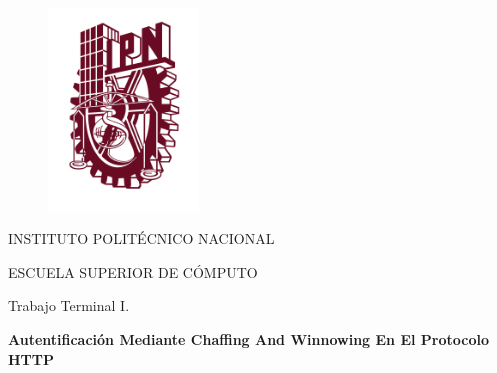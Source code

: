 \documentclass[12pt, a4paper, titlepage]{article}
\begin{document}
	
	\begin{titlepage}	
		
		\vspace*{-1.5in}
		
		\begin{figure}[htb]
			\begin{center}
				\includegraphics[width=4cm]{./imagenes/logoipn.png}
			\end{center}
		\end{figure}
		
		\begin{center}
			
			\begin{LARGE}
				\textcolor{guindapoli}{INSTITUTO POLITÉCNICO NACIONAL}\\
			\end{LARGE}	
			
			\vspace*{0.2in}
			
			\begin{Large}
				\textcolor{azulescom}{ESCUELA SUPERIOR DE CÓMPUTO}\\
			\end{Large}		
			
			\vspace*{0.4in}
			
			\begin{large}
				Trabajo Terminal I.\\
			\end{large}
			
			\vspace*{0.2in}
			
			\begin{Large}
				\textbf{Autentificación Mediante Chaffing And Winnowing En El Protocolo HTTP}\\
			\end{Large}
			
			\vspace*{0.2in}
			

\end{center}
\end{titlepage}
\end{document}
